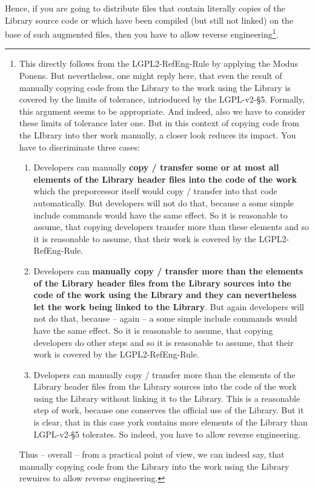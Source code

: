 Hence, if you are going to distribute files that contain literally copies of the
Library source code or which have been compiled (but still not linked) on the
base of such augmented files, then you have to allow reverse
engineering\footnote{This directly follows from the LGPL2-RefEng-Rule by
applying the Modus Ponens. But nevertheless, one might reply here, that even the
result of manually copying code from the Library to the work using the Library
is covered by the limits of tolerance, intrioduced by the LGPL-v2-§5. Formally,
this argument seems to be appropriate. And indeed, also we have to consider
these limits of tolerance later one. But in this context of copying code from
the LIbrary into ther work manually, a closer look reduces its impact. You
have to discriminate three cases:
\begin{enumerate}
  \item Developers can manually \textbf{copy / transfer some or at most all
  elements of the Library header files into the code of the work} which the
  preporcessor itself would copy / transfer into that code automatically. But
  developers will not do that, because a some simple include commands would have
  the same effect. So it is reasonable to assume, that copying developers
  transfer more than these elements and so it is reasonable to assume, that
  their work is covered by the LGPL2-RefEng-Rule.
  \item Developers can \textbf{manually copy / transfer more than the elements
  of the Library header files from the Library sources into the code of the work
  using the Library and they can nevertheless let the work being linked to the
  Library}. But again developers will not do that, because -- again -- a some
  simple include commands would have the same effect. So it is reasonable to
  assume, that copying developers do other steps and so it is reasonable to
  assume, that their work is covered by the LGPL2-RefEng-Rule.
  \item Dvelopers can manually copy / transfer more than the elements of the
  Library header files from the Library sources into the code of the work using
  the Library without linking it to the Library. This is a reasonable step of
  work, because one conserves the official use of the Library. But it is clear,
  that in this case york contains more elements of the Library than LGPL-v2-§5
  tolerates. So indeed, you have to allow reverse engineering.
\end{enumerate}
Thus -- overall -- from a practical point of view, we can indeed say, that
manually copying code from the Library into the work using the Library
rewuires to allow reverse engineering.}.

